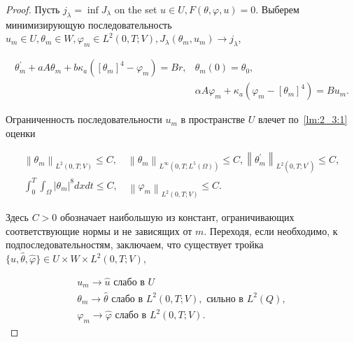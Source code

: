 \begin{proof}
    Пусть $j_{\lambda}=\inf J_{\lambda}$ on the set $u \in U, F(\theta, \varphi, u)=0$.
    Выберем минимизирующую последовательность
    $u_{m} \in U, \theta_{m} \in W, \varphi_{m} \in L^{2}(0, T; V),
    J_{\lambda}\left(\theta_{m}, u_{m}\right) \rightarrow j_{\lambda}$,

    \begin{equation}
        \label{eq:2_3:13}
        \begin{aligned}
            \theta_{m}^{\prime}+a A \theta_{m}
            + b \kappa_{a}\left(\left[\theta_{m}\right]^{4}
            - \varphi_{m}\right)=B r, & \theta_{m}(0)=\theta_{0}, \\
            & \alpha A \varphi_{m}+\kappa_{a}\left(\varphi_{m}-
            \left[\theta_{m}\right]^{4}\right)=B u_{m}.
        \end{aligned}
    \end{equation}

    Ограниченность последовательности $u_{m}$
    в пространстве $U$ влечет по~\ref{lm:2_3:1} оценки

    \[
        \begin{gathered}
            \left\|\theta_{m}\right\|_{L^{2}(0, T ; V)} \leq C,
            \quad\left\|\theta_{m}\right\|_{L^{\infty}\left(0, T; L^{5}(\Omega)\right)} \leq C,
            \left\|\theta_{m}^{\prime}\right\|_{L^{2}\left(0, T; V^{\prime}\right)} \leq C, \\
            \int_{0}^{T} \int_{\Omega}\left|\theta_{m}\right|^{8} d x d t \leq C,
            \quad\left\|\varphi_{m}\right\|_{L^{2}(0, T ; V)} \leq C.
        \end{gathered}
    \]

    Здесь $C>0$ обозначает наибольшую из констант,
    ограничивающих соответствующие нормы и не зависящих от $m$.
    Переходя, если необходимо, к подпоследовательностям, заключаем, что существует тройка
    $\{\widehat{u}, \widehat{\theta}, \widehat{\varphi}\}
    \in U \times W \times L^{2}(0, T; V)$,

    \[
        \begin{gathered}
            u_{m} \rightarrow \widehat{u} \text { слабо в } U \\
            \theta_{m} \rightarrow \widehat{\theta}
            \text{ слабо в } L^{2}(0, T; V), \text { сильно в } L^{2}(Q), \\
            \varphi_{m} \rightarrow \widehat{\varphi}
            \text{ слабо в }  L^{2}(0, T ; V).
        \end{gathered}
    \]



\end{proof}
